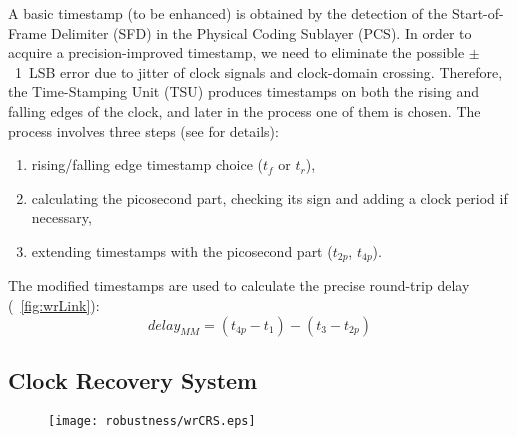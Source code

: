 A basic timestamp (to be enhanced) is obtained by the detection of 
the Start-of-Frame Delimiter (SFD) in the Physical Coding Sublayer (PCS).
In order to acquire a precision-improved timestamp, we need to eliminate the possible 
$\pm$~1~LSB error  %
due to jitter of clock signals and clock-domain crossing. 
Therefore, the Time-Stamping Unit (TSU) produces timestamps on both the rising 
and falling edges of the clock, and later in the process one of them is chosen.
The process involves three steps (see \cite{biblio:TomekMSc} for details):
\begin{enumerate}
   \item rising/falling edge timestamp choice ($t_f$ or $t_r$),
   \item calculating the picosecond part, checking
         its sign and adding a clock period if necessary,
   \item extending timestamps with the picosecond part ($t_{2p}$, $t_{4p}$).
 \end{enumerate}
The modified timestamps are used to calculate the precise round-trip delay
(\figurename~\ref{fig:wrLink}):
\begin{equation}
  \label{eq:delaymm}
  delay_{MM} = (t_{4p}-t_{1}) - (t_{3}-t_{2p})
\end{equation}




\subsection{ Clock Recovery System}
\label{sec:wrCRS}

\begin{figure}[!t]
\centering
\texttt{[image: robustness/wrCRS.eps]}
\caption{}
\label{fig:PLL}
\end{figure}

